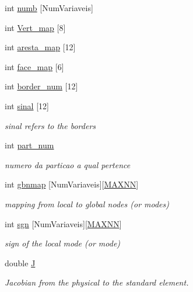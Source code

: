 \begin{DoxyCompactItemize}
\item 
int \hyperlink{classPhElem_ad95c9f8ee7a993ccc7f9cdd08dddf5f6}{numb} \mbox{[}Num\+Variaveis\mbox{]}
\item 
int \hyperlink{classPhElem_a07f19f862b13cc9c5f80271b03a5a023}{Vert\+\_\+map} \mbox{[}8\mbox{]}
\item 
int \hyperlink{classPhElem_a27a4f856d62b68758e4c03c09b4c37f8}{aresta\+\_\+map} \mbox{[}12\mbox{]}
\item 
int \hyperlink{classPhElem_a300b484c07390b9016d9ed97980d76b3}{face\+\_\+map} \mbox{[}6\mbox{]}
\item 
int \hyperlink{classPhElem_ad153ce0aef191aac0f28f2addd213c71}{border\+\_\+num} \mbox{[}12\mbox{]}
\item 
int \hyperlink{classPhElem_a4034b9b2a458d1277ca74e4e8a49627e}{sinal} \mbox{[}12\mbox{]}
\begin{DoxyCompactList}\small\item\em sinal refers to the borders \end{DoxyCompactList}\item 
int \hyperlink{classPhElem_a141616ccadb4a17328626befc4330932}{part\+\_\+num}
\begin{DoxyCompactList}\small\item\em numero da particao a qual pertence \end{DoxyCompactList}\item 
int \hyperlink{classPhElem_ab27e9040a72ec923a90cffb25f5b0c15}{gbnmap} \mbox{[}Num\+Variaveis\mbox{]}\mbox{[}\hyperlink{MyOptions_8h_a2f91e7a0b4bf68a62a0f3d38904dea2c}{M\+A\+X\+NN}\mbox{]}
\begin{DoxyCompactList}\small\item\em mapping from local to global nodes (or modes) \end{DoxyCompactList}\item 
int \hyperlink{classPhElem_a5bb9ccd4ccebf12ff0937d807c443caf}{sgn} \mbox{[}Num\+Variaveis\mbox{]}\mbox{[}\hyperlink{MyOptions_8h_a2f91e7a0b4bf68a62a0f3d38904dea2c}{M\+A\+X\+NN}\mbox{]}
\begin{DoxyCompactList}\small\item\em sign of the local mode (or mode) \end{DoxyCompactList}\item 
double \hyperlink{classPhElem_a27acf6bc6ac9eaf94a7cce52522b3b92}{J}
\begin{DoxyCompactList}\small\item\em Jacobian from the physical to the standard element. \end{DoxyCompactList}\item 

\end{DoxyCompactItemize}
